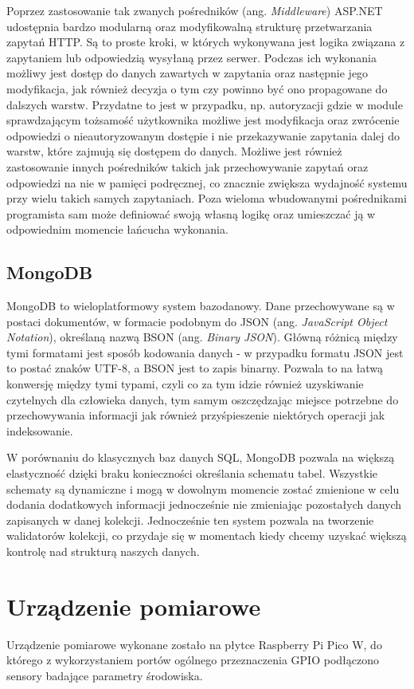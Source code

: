 Poprzez zastosowanie tak zwanych pośredników (ang. \textit{Middleware}) ASP.NET udostępnia
bardzo modularną oraz modyfikowalną strukturę przetwarzania zapytań HTTP.
Są to proste kroki, w których wykonywana jest logika związana z zapytaniem lub odpowiedzią
wysyłaną przez serwer. Podczas ich wykonania możliwy jest dostęp do danych zawartych
w zapytania oraz następnie jego modyfikacja, jak również decyzja o tym czy powinno
być ono propagowane do dalszych warstw. Przydatne to jest w przypadku, np. autoryzacji
gdzie w module sprawdzającym tożsamość użytkownika możliwe jest modyfikacja oraz zwrócenie
odpowiedzi o nieautoryzowanym dostępie i nie przekazywanie zapytania dalej do warstw, które zajmują
się dostępem do danych. Możliwe jest również zastosowanie innych pośredników takich
jak przechowywanie zapytań oraz odpowiedzi na nie w pamięci podręcznej, co znacznie
zwiększa wydajność systemu przy wielu takich samych zapytaniach. Poza wieloma wbudowanymi
pośrednikami programista sam może definiować swoją własną logikę oraz umieszczać
ją w odpowiednim momencie łańcucha wykonania.

\subsection*{MongoDB}
MongoDB to wieloplatformowy system bazodanowy. Dane przechowywane są w postaci dokumentów,
w formacie podobnym do JSON (ang. \textit{JavaScript Object Notation}), określaną nazwą
BSON (ang. \textit{Binary JSON}). Główną różnicą między tymi formatami jest sposób kodowania
danych - w przypadku formatu JSON jest to postać znaków UTF-8, a BSON jest to zapis binarny.
Pozwala to na łatwą konwersję między tymi typami, czyli co za tym idzie również uzyskiwanie
czytelnych dla człowieka danych, tym samym oszczędzając miejsce potrzebne do przechowywania
informacji jak również przyśpieszenie niektórych operacji jak indeksowanie.

W porównaniu do klasycznych baz danych SQL, MongoDB pozwala na większą elastyczność dzięki braku
konieczności określania schematu tabel. Wszystkie schematy są dynamiczne i mogą w dowolnym momencie 
zostać zmienione w celu dodania dodatkowych informacji jednocześnie nie zmieniając pozostałych
danych zapisanych w danej kolekcji. Jednocześnie ten system pozwala na tworzenie 
walidatorów kolekcji, co przydaje się w momentach kiedy chcemy uzyskać większą kontrolę
nad strukturą naszych danych.

\section{Urządzenie pomiarowe}
Urządzenie pomiarowe wykonane zostało na płytce Raspberry Pi Pico W, do którego z wykorzystaniem
portów ogólnego przeznaczenia GPIO podłączono sensory badające parametry środowiska.

